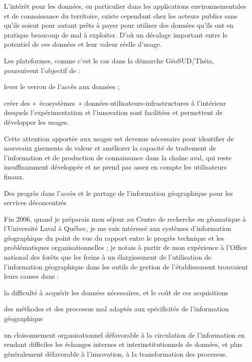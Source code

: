 L'intérêt pour les données, en particulier dans les applications
environnementales et de connaissance du territoire, existe cependant chez les
acteurs publics sans qu'ils soient pour autant prêts à payer pour utiliser des
données qu'ils ont en pratique beaucoup de mal à exploiter. D'où un décalage
important entre le potentiel de ces données et leur valeur réelle d’usage.

Les plateformes, comme c'est le cas dans la démarche GéoSUD/Théia, poursuivent
l'objectif de :

\startitemize

\item lever le verrou de l'accès aux données ;

\item créer des « écosystèmes » données-utilisateurs-infrastructures à l'intérieur
desquels l'expérimentation et l'innovation sont facilitées et permettent de
développer les usages.

\stopitemize

Cette attention apportée aux usages est devenue nécessaire pour identifier de
nouveaux gisements de valeur et améliorer la capacité de traitement de
l'information et de production de connaissance dans la chaîne aval, qui reste
insuffisamment développée et ne prend pas assez en compte les utilisateurs
finaux.

Des progrès dans l'accès et le partage de l'information géographique pour les
services déconcentrés

Fin 2006, quand je préparais mon séjour au Centre de recherche en géomatique à
l'Université Laval à Québec, je me suis intéressé aux systèmes d'information
géographique du point de vue du rapport entre le progrès technique et les
problématiques organisationnelles ; je notais à partir de mon expérience à
l'Office  national des forêts que les freins à un élargissement de
l'utilisation de l'information géographique dans les outils de gestion de
l'établissement trouvaient leurs causes dans :

\startitemize

\item la difficulté à acquérir les données nécessaires, et le coût de ces
acquisitions

\item des méthodes et des processus mal adaptés aux spécificités de l'information
géographique

\item un cloisonnement organisationnel défavorable à la circulation de l'information
en rendant difficiles les échanges internes et interinstitutionnels de
données, et plus généralement défavorable à l'innovation, à la transformation
des processus.

